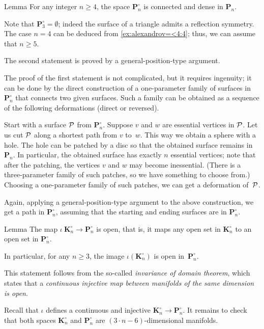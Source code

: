 \begin{thm}{Lemma}\label{lem:connected}
For any integer $n\ge 4$, the space $\bm{P}_n^\circ$ is connected and dense in $\bm{P}_n$.
\end{thm}

Note that $\bm{P}_3^\circ=\emptyset$;
indeed the surface of a triangle admits a reflection symmetry.
The case $n=4$ can be deduced from \ref{ex:alexandrov=<4:4}; thus, we can assume that $n\ge 5$.

The second statement is proved by a general-position-type argument.

The proof of the first statement is not complicated, but it requires ingenuity;
it can be done by the direct construction of a one-parameter family of surfaces in $\bm{P}_n^\circ$ that connects two given surfaces.
Such a family can be obtained as a sequence of the following deformations (direct or reversed).

Start with a surface $\mathcal{P}$ from $\bm{P}_n^\circ$.
Suppose $v$ and $w$ are essential vertices in $\mathcal{P}$.
Let us cut $\mathcal{P}$ along a shortest path from $v$ to~$w$.
This way we obtain a sphere with a hole.
The hole can be patched by a disc so that the obtained surface remains in $\bm{P}_n$.
In particular, the obtained surface has exactly $n$ essential vertices;
note that after the patching, the vertices $v$ and $w$ may become inessential.
(There is a three-parameter family of such patches, so we have something to choose from.)
Choosing a one-parameter family of such patches, we can get a deformation of~$\mathcal{P}$.

Again, applying a general-position-type argument to the above construction, we get a path in $\bm{P}_n^\circ$, assuming that the starting and ending surfaces are in $\bm{P}_n^\circ$.

\begin{thm}{Lemma}\label{lem:open}
The map $\iota\:\bm{K}_n^\circ\to\bm{P}_n^\circ$ is open,
that is, it maps any open set in $\bm{K}_n^\circ$ to an open set in $\bm{P}_n^\circ$.

In particular, for any $n\ge 3$, the image $\iota(\bm{K}_n^\circ)$ is open in~$\bm{P}_n^\circ$.
\end{thm}

This statement follows from the so-called \emph{invariance of domain theorem},
which states that a \textit{continuous injective map between manifolds of the same dimension is open}.

Recall that $\iota$ defines a continuous and injective $\bm{K}_n^\circ\to\bm{P}_n^\circ$.
It remains to check that both spaces $\bm{K}_n^\circ$ and $\bm{P}_n^\circ$ are $(3\cdot n-6)$-dimensional manifolds.

